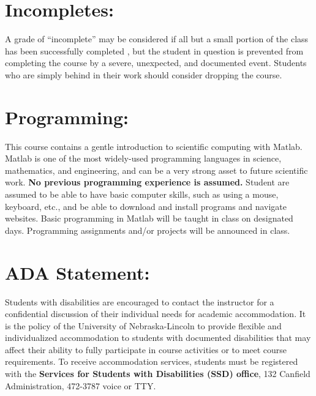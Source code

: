 \documentclass[margin]{res}
\theoremstyle{plain}
\theoremstyle{definition}
\theoremstyle{remark}
\begin{document}
\begin{resume}
\section{Incompletes:}
A grade of ``incomplete'' may be considered if all but a small portion of the class has been successfully completed , but the student in question is prevented from completing the course by a severe, unexpected, and documented event. Students who are simply behind in their work should consider dropping the course.

\section{Programming:}   This course contains a gentle introduction to scientific computing with Matlab.  Matlab is one of the most widely-used programming languages in science, mathematics, and engineering, and can be a very strong asset to future scientific work.  \textbf{No previous programming experience is assumed.}  Student are assumed to be able to have basic computer skills, such as using a mouse, keyboard, etc., and be able to download and install programs and navigate websites.  Basic programming in Matlab will be taught in class on designated days.  Programming assignments and/or projects will be announced in class.



\section{ADA  Statement:} Students with disabilities are encouraged to contact the instructor for a confidential discussion of their individual needs for academic accommodation. It is the policy of the University of Nebraska-Lincoln to provide flexible and individualized accommodation to students with documented disabilities that may affect their ability to fully participate in course activities or to meet course requirements. To receive accommodation services, students must be registered with the  {\bf Services for Students with Disabilities (SSD) office}, 132 Canfield Administration, 472-3787 voice or TTY. 



\end{resume}
\end{document}

